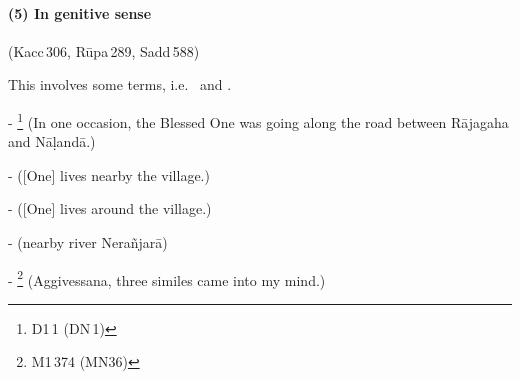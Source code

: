 \paragraph*{(5) In genitive sense} (Kacc\,306, R\=upa\,289, Sadd\,588)\par
This involves some terms, i.e.\  and .\par
- \footnote{D1\,1 (DN\,1)} (In one occasion, the Blessed One was going along the road between R\=ajagaha and N\=a\d land\=a.)\par
-  ([One] lives nearby the village.)\par
-  ([One] lives around the village.)\par
-  (nearby river Nera\~njar\=a)\par
- \footnote{M1\,374 (MN36)} (Aggivessana, three similes came into my mind.)\par


